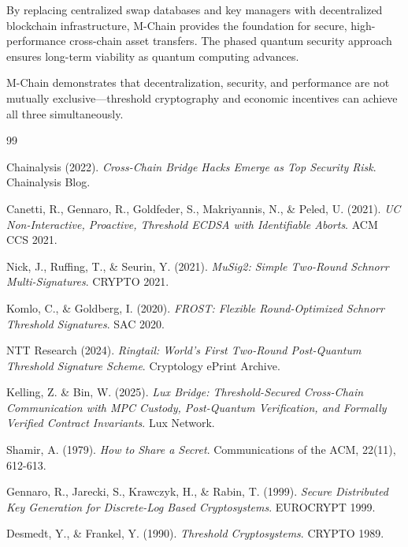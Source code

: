 \documentclass[11pt]{article}
\begin{document}
By replacing centralized swap databases and key managers with decentralized blockchain infrastructure, M-Chain provides the foundation for secure, high-performance cross-chain asset transfers. The phased quantum security approach ensures long-term viability as quantum computing advances.

M-Chain demonstrates that decentralization, security, and performance are not mutually exclusive---threshold cryptography and economic incentives can achieve all three simultaneously.

\begin{thebibliography}{99}

Chainalysis (2022).
\textit{Cross-Chain Bridge Hacks Emerge as Top Security Risk}.
Chainalysis Blog.

Canetti, R., Gennaro, R., Goldfeder, S., Makriyannis, N., \& Peled, U. (2021).
\textit{UC Non-Interactive, Proactive, Threshold ECDSA with Identifiable Aborts}.
ACM CCS 2021.

Nick, J., Ruffing, T., \& Seurin, Y. (2021).
\textit{MuSig2: Simple Two-Round Schnorr Multi-Signatures}.
CRYPTO 2021.

Komlo, C., \& Goldberg, I. (2020).
\textit{FROST: Flexible Round-Optimized Schnorr Threshold Signatures}.
SAC 2020.

NTT Research (2024).
\textit{Ringtail: World's First Two-Round Post-Quantum Threshold Signature Scheme}.
Cryptology ePrint Archive.

Kelling, Z. \& Bin, W. (2025).
\textit{Lux Bridge: Threshold-Secured Cross-Chain Communication with MPC Custody, Post-Quantum Verification, and Formally Verified Contract Invariants}.
Lux Network.

Shamir, A. (1979).
\textit{How to Share a Secret}.
Communications of the ACM, 22(11), 612-613.

Gennaro, R., Jarecki, S., Krawczyk, H., \& Rabin, T. (1999).
\textit{Secure Distributed Key Generation for Discrete-Log Based Cryptosystems}.
EUROCRYPT 1999.

Desmedt, Y., \& Frankel, Y. (1990).
\textit{Threshold Cryptosystems}.
CRYPTO 1989.

\end{thebibliography}
\end{document}

